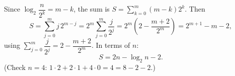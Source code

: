Since $\log_2\dfrac{n}{2^k}=m-k$, the sum is $S=\sum_{k=0}^m(m-k)2^k$. Then
\[S=\sum_{j=0}^{m}j\,2^{m-j}=2^m\sum_{j=0}^m\dfrac{j}{2^j}=2^m\left(2-\dfrac{m+2}{2^m}\right)=2^{m+1}-m-2,\]
using $\sum_{j=0}^m\dfrac{j}{2^j}=2-\dfrac{m+2}{2^m}$. In terms of $n$:
\[S=\boxed{2n-\log_2n-2}.\]
(Check $n=4$: $1\cdot2+2\cdot1+4\cdot0=4=8-2-2$.)
